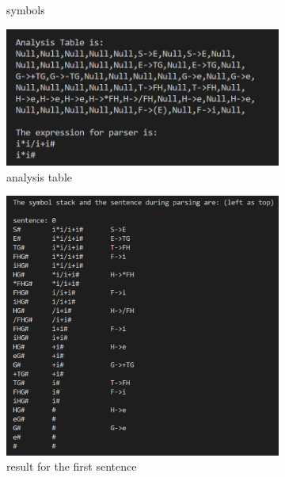 \documentclass{zpt}
\begin{document}
\begin{figure}[H]
\begin{subfigure}[b]{0.4\textwidth}
            \caption{symbols}
            \label{fig::symbol}
        \end{subfigure}
        \begin{subfigure}[b]{0.4\textwidth}
            \includegraphics[width=\textwidth]{../resources/table.png}
            \caption{analysis table}
            \label{fig::table}
        \end{subfigure}
        \begin{subfigure}[b]{0.4\textwidth}
            \includegraphics[width=\textwidth]{../resources/sentence0.png}
            \caption{result for the first sentence}
            \label{fig::sentence0}
        \end{subfigure}
        \begin{subfigure}[b]{0.4\textwidth}

\end{subfigure}
\end{figure}
\end{document}
